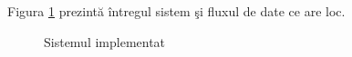 Figura \ref{figsistem} prezint\u{a} \^{i}ntregul sistem \c{s}i fluxul de date ce are loc.

\begin{figure}[tbp]
  \centering
  \caption{Sistemul implementat}
  \label{figsistem}
\end{figure}
